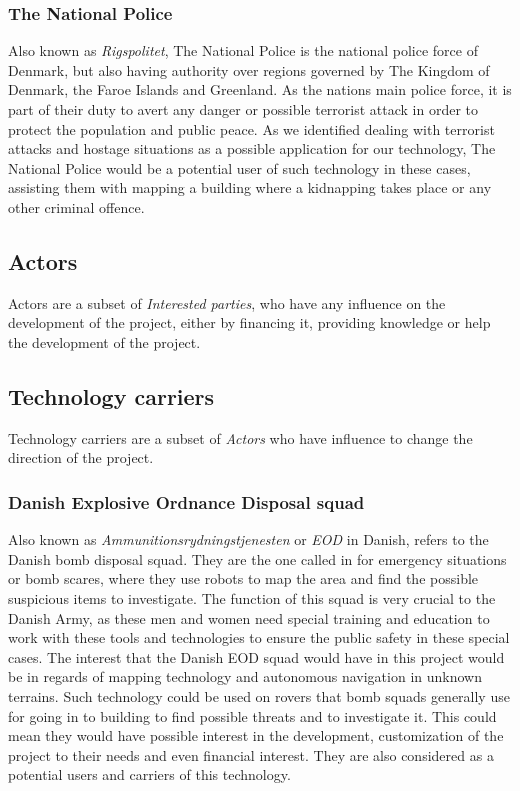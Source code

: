 \subsubsection{The National Police}
Also known as \textit{Rigspolitet}\cite{Police}, The National Police is the national police force of Denmark, but also having authority over regions governed by The Kingdom of Denmark, the Faroe Islands and Greenland. As the nations main police force, it is part of their duty to avert any danger or possible terrorist attack in order to protect the population and public peace. As we identified dealing with terrorist attacks and hostage situations as a possible application for our technology, The National Police would be a potential user of such technology in these cases, assisting them with mapping a building where a kidnapping takes place or any other criminal offence.

\subsection{Actors}
Actors are a subset of \textit{Interested parties}, who have any influence on the development of the project, either by financing it, providing knowledge or help the development of the project.
	
\subsection{Technology carriers}
Technology carriers are a subset of \textit{Actors} who have influence to change the direction of the project.

\subsubsection{Danish Explosive Ordnance Disposal squad} 
Also known as \textit{Ammunitionsrydningstjenesten} or \textit{EOD} in Danish, refers to the Danish bomb disposal squad\cite{EOD}. They are the one called in for emergency situations or bomb scares, where they use robots to map the area and find the possible suspicious items to investigate. The function of this squad is very crucial to the Danish Army, as these men and women need special training and education to work with these tools and technologies to ensure the public safety in these special cases. The interest that the Danish EOD squad would have in this project would be in regards of mapping technology and autonomous navigation in unknown terrains. Such technology could be used on rovers that bomb squads generally use for going in to building to find possible threats and to investigate it. This could mean they would have possible interest in the development, customization of the project to their needs and even financial interest. They are also considered as a potential users and carriers of this technology.

